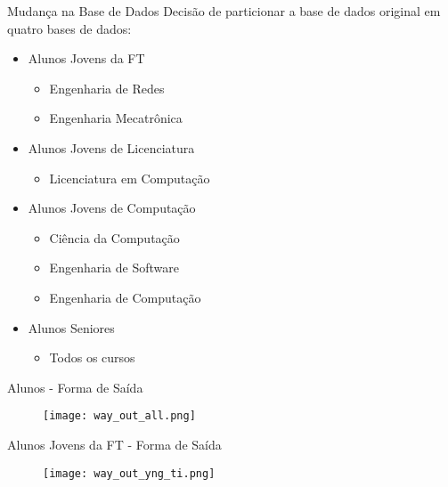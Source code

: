\begin{frame}{Mudança na Base de Dados}
    Decisão de particionar a base de dados original em quatro bases de dados:
    \begin{itemize}
        \item Alunos Jovens da FT 
            \begin{itemize}
                \item Engenharia de Redes
                \item Engenharia Mecatrônica
            \end{itemize}

        \item Alunos Jovens de Licenciatura
            \begin{itemize}
                \item Licenciatura em Computação
            \end{itemize}

        \item Alunos Jovens de Computação
            \begin{itemize}
                \item Ciência da Computação
                \item Engenharia de Software
                \item Engenharia de Computação
            \end{itemize}
        \item Alunos Seniores
            \begin{itemize}
                \item Todos os cursos
            \end{itemize}
    \end{itemize}
\end{frame}

\begin{frame}{Alunos - Forma de Saída}
    \begin{figure}[!ht]
        \centering
        \texttt{[image: way\_out\_all.png]}
    \end{figure}
\end{frame}

\begin{frame}{Alunos Jovens da FT - Forma de Saída}
    \begin{figure}[!ht]
        \centering
        \texttt{[image: way\_out\_yng\_ti.png]}
    \end{figure}
\end{frame}

